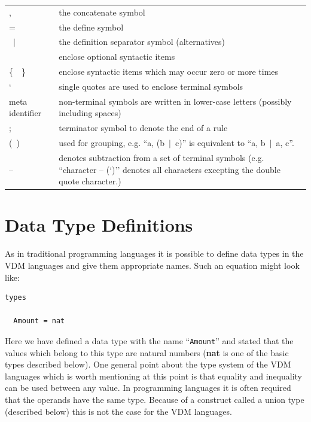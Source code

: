 \documentclass{overturerepchap}
\newcommand{\Lit}[1]{`{\tt #1}\Quote}
\newcommand{\SeqPt}[1]{\{\ #1\ \}}
\newcommand{\dsepl}{\ $|$\ }
\newcommand{\keyw}[1]{{\bf\ttfamily #1}}
\newcommand{\OptPt}[1]{[\ #1\ ]}
\begin{document}
\newcommand{\singleQuote}{\texttt{\symbol{34}}}
\begin{tabular}{l@{\hspace{1cm}}p{10cm}}
  , &  the concatenate symbol \\
  = & the define symbol \\
  \dsepl & the definition separator symbol (alternatives)\\
  \OptPt{} & enclose optional syntactic items \\
  \SeqPt{} & enclose syntactic items which may occur zero or more times \\
  \Lit{ } & single quotes are used to enclose terminal symbols \\
    meta identifier & non-terminal symbols are written in lower-case letters
    (possibly including spaces) \\
  ;  & terminator symbol to denote the end of a rule \\
  (\ ) & used for grouping, e.g. ``a, (b\dsepl c)'' is equivalent to
    ``a, b\dsepl a, c''. \\
  -- & denotes subtraction from a set of terminal symbols 
    (e.g. ``character -- (\Lit{\singleQuote})'' denotes all characters
    excepting the double quote character.)
\end{tabular}

\chapter{Data Type Definitions}
\label{typedef}

As in traditional programming languages it is possible to define data
types in the VDM languages and give them appropriate names.
Such an equation might look like:

\begin{lstlisting}
types

  Amount = nat
\end{lstlisting}

Here we have defined a data type with the name ``{\tt Amount}'' and
stated that the values which belong to this type are natural numbers
(\keyw{nat} is one of the basic types described below). One general
point about the type system of the VDM languages which is
worth mentioning at this point is that equality and inequality can be
used between any value. In programming languages it is often required
that the operands have the same type. Because of a 
construct called a union type (described below) this is not the case
for the VDM languages.
\end{document}
